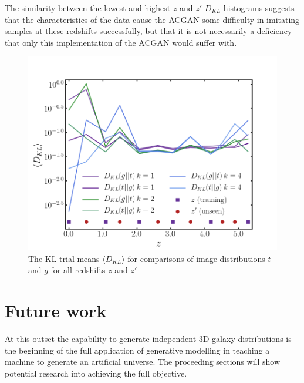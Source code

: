 \documentclass[twocolumn]{article}
\numberwithin{equation}{section}
\begin{document}
The similarity between the lowest and highest $z$ and $z'$ $D_{KL}$-histograms suggests that the characteristics of the data 
cause the ACGAN some difficulty in imitating samples at these redshifts successfully, but that it is not necessarily a deficiency 
that only this implementation of the ACGAN would suffer with.


\begin{figure}[!ht]%
\includegraphics[width=\columnwidth]{figures/graphs/z_kl4.png}
\centering
\caption{The KL-trial means $\langle D_{KL} \rangle$ for comparisons of image distributions 
         $t$ and $g$ for all redshifts $z$ and $z'$ }
\label{fig:z_kl}
\end{figure}




\section{Future work}\label{sec:future_work}
At this outset the capability to generate independent 3D galaxy distributions is the beginning of the full application of 
generative modelling in teaching a machine to generate an artificial universe. The proceeding sections will show potential 
research into achieving the full objective.
\end{document}

